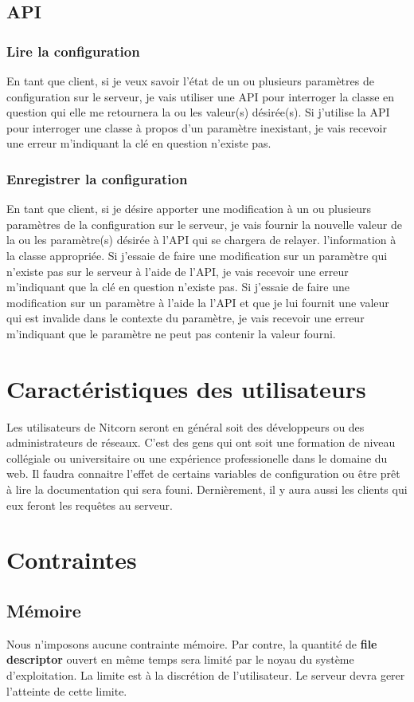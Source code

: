 \documentclass{scrreprt}
\begin{document}
\subsection{API}
\subsubsection{Lire la configuration}
En tant que client, si je veux savoir l'état de un ou plusieurs paramètres de
configuration sur le serveur, je vais utiliser une API pour interroger la
classe en question qui elle me retournera la ou les valeur(s) désirée(s).
Si j'utilise la API pour interroger une classe à propos d'un paramètre
inexistant, je vais recevoir une erreur m'indiquant la clé en question
n'existe pas.

\subsubsection{Enregistrer la configuration}
En tant que client, si je désire apporter une modification à un ou plusieurs
paramètres de la configuration sur le serveur, je vais fournir la nouvelle valeur
de la ou les paramètre(s) désirée à l'API qui se chargera de relayer.
l'information à la classe appropriée.
Si j'essaie de faire une modification sur un paramètre qui n'existe pas sur le
serveur à l'aide de l'API, je vais recevoir une erreur m'indiquant que la clé en
question n'existe pas.
Si j'essaie de faire une modification sur un paramètre à l'aide la l'API et que
je lui fournit une valeur qui est invalide dans le contexte du paramètre, je
vais recevoir une erreur m'indiquant que le paramètre ne peut pas contenir
la valeur fourni.
\section{Caractéristiques des utilisateurs}
Les utilisateurs de Nitcorn seront en général soit des développeurs ou des
administrateurs de réseaux. C'est des gens qui ont soit une formation de
niveau collégiale ou universitaire ou une expérience professionelle dans
le domaine du web. Il faudra connaitre l'effet de certains variables de
configuration ou être prêt à lire la documentation qui sera founi.
Dernièrement, il y aura aussi les clients qui eux feront les requêtes
au serveur.
\section{Contraintes}

\subsection{Mémoire}
Nous n'imposons aucune contrainte mémoire. Par contre, la quantité de
\textbf{file descriptor} ouvert en même temps sera limité par le noyau du
système d'exploitation. La limite est à la discrétion de l'utilisateur. Le
serveur devra gerer l'atteinte de cette limite.
\end{document}
